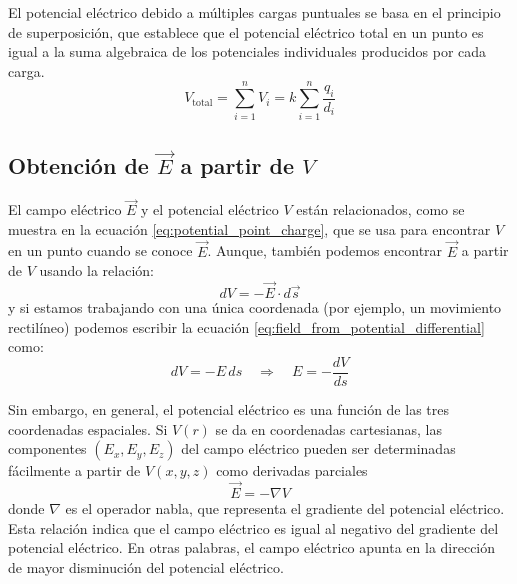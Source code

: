 El potencial eléctrico debido a múltiples cargas puntuales se basa en el principio de superposición, que establece que el potencial eléctrico total en un punto es igual a la suma algebraica de los potenciales individuales producidos por cada carga.
\begin{equation}
    V_\text{total} = \sum_{i=1}^{n} V_i = k \sum_{i=1}^{n} \frac{q_i}{d_i}
\end{equation}

\subsection{Obtención de \texorpdfstring{\(\vec{E}\)}{E} a partir de \texorpdfstring{\(V\)}{V}}

El campo eléctrico \(\vec{E}\) y el potencial eléctrico \(V\) están relacionados, como se muestra en la ecuación \eqref{eq:potential_point_charge}, que se usa para encontrar \(V\) en un punto cuando se conoce \(\vec{E}\). Aunque, también podemos encontrar \(\vec{E}\) a partir de \(V\) usando la relación:
\begin{equation}
  dV = -\vec{E} \cdot d\vec{s}
  \label{eq:field_from_potential_differential}
\end{equation}
y si estamos trabajando con una única coordenada (por ejemplo, un movimiento rectilíneo) podemos escribir la ecuación \eqref{eq:field_from_potential_differential} como:
\[
  dV = -E \, ds \quad \Rightarrow \quad E = -\frac{dV}{ds}
\]

Sin embargo, en general, el potencial eléctrico es una función de las tres coordenadas espaciales. Si \(V(r)\) se da en coordenadas cartesianas, las componentes \((E_x, E_y, E_z)\) del campo eléctrico pueden ser determinadas fácilmente a partir de \(V(x, y, z)\) como derivadas parciales
\begin{equation}
  \boxed{
    \vec{E} = -\nabla V
  }
  \label{eq_gradiente_de_potencial}
\end{equation}
donde \(\nabla\) es el operador nabla, que representa el gradiente del potencial eléctrico. Esta relación indica que el campo eléctrico es igual al negativo del gradiente del potencial eléctrico. En otras palabras, el campo eléctrico apunta en la dirección de mayor disminución del potencial eléctrico.

